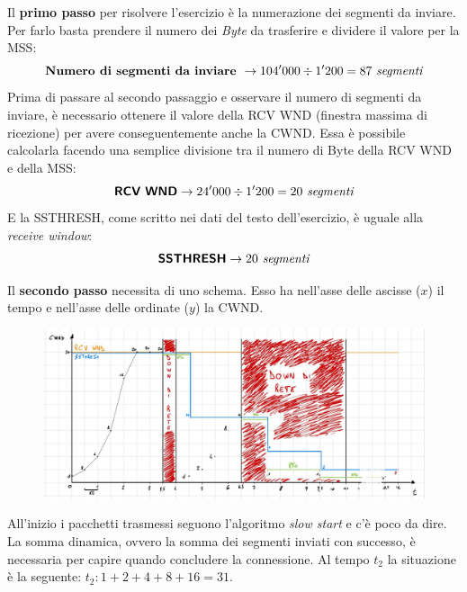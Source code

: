 \documentclass[a4paper]{article}
\begin{document}
	\noindent
	Il \textbf{primo passo} per risolvere l'esercizio è la numerazione dei segmenti da inviare. Per farlo basta prendere il numero dei \emph{Byte} da trasferire e dividere il valore per la \textsf{MSS}:
	\begin{equation*}
		\textbf{Numero di segmenti da inviare } \rightarrow 104'000 \div 1'200 = 87 \emph{ segmenti}
	\end{equation*}
	Prima di passare al secondo passaggio e osservare il numero di segmenti da inviare, è necessario ottenere il valore della \textsf{RCV WND} (finestra massima di ricezione) per avere conseguentemente anche la \textsf{CWND}. Essa è possibile calcolarla facendo una semplice divisione tra il numero di Byte della \textsf{RCV WND} e della \textsf{MSS}:
	\begin{equation*}
		\textbf{\textsf{RCV WND}} \rightarrow 24'000 \div 1'200 = 20 \emph{ segmenti}
	\end{equation*}
	E la \textsf{SSTHRESH}, come scritto nei dati del testo dell'esercizio, è uguale alla \emph{receive window}:
	\begin{equation*}
		\textsf{\textbf{SSTHRESH}} \rightarrow 20 \emph{ segmenti}
	\end{equation*}\newpage

	\noindent
	Il \textbf{secondo passo} necessita di uno schema. Esso ha nell'asse delle ascisse ($x$) il tempo e nell'asse delle ordinate ($y$) la \textsf{CWND}.
	\begin{figure}[!htp]
		\centering
		\includegraphics[width=\textwidth]{img/ex3_congestione.pdf}
	\end{figure}

	\noindent
	All’inizio i pacchetti trasmessi seguono l’algoritmo \emph{slow start} e c’è poco da dire. La somma dinamica, ovvero la somma dei segmenti inviati con successo, è necessaria per capire quando concludere la connessione. Al tempo $t_{2}$ la situazione è la seguente: $t_{2} : 1+2+4+8+16 = 31$.\newline
	
\end{document}
